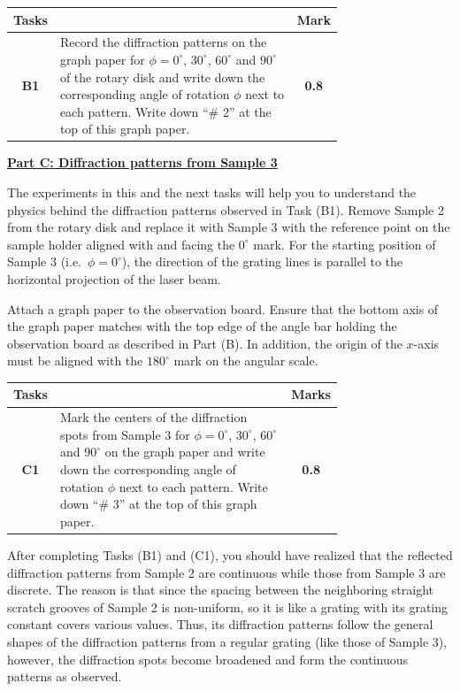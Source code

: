 \noindent\begin{tabular}{|c|p{0.74\linewidth}|c|}
\hline
\textbf{Tasks} & & \textbf{Mark} \\ \hline
\textbf{B1} & Record the diffraction patterns on the graph paper for $\phi = 0^{\circ}$, $30^{\circ}$, $60^{\circ}$ and $90^{\circ}$ of the rotary disk and write down the corresponding angle of rotation $\phi$ next to each pattern. Write down ``\# 2'' at the top of this graph paper. & \textbf{0.8} \\ \hline
\end{tabular}

\underline{\textbf{Part C: Diffraction patterns from Sample 3}}

The experiments in this and the next tasks will help you to understand the physics behind the diffraction patterns observed in Task (B1). Remove Sample 2 from the rotary disk and replace it with Sample 3 with the reference point on the sample holder aligned with and facing the $0^{\circ}$ mark. For the starting position of Sample 3 (i.e.\ $\phi = 0^{\circ}$), the direction of the grating lines is parallel to the horizontal projection of the laser beam.

Attach a graph paper to the observation board. Ensure that the bottom axis of the graph paper matches with the top edge of the angle bar holding the observation board as described in Part (B). In addition, the origin of the $x$-axis must be aligned with the $180^{\circ}$ mark on the angular scale.

\noindent\begin{tabular}{|c|p{0.74\linewidth}|c|}
\hline
\textbf{Tasks} & & \textbf{Marks} \\ \hline
\textbf{C1} & Mark the centers of the diffraction spots from Sample 3 for $\phi = 0^{\circ}$, $30^{\circ}$, $60^{\circ}$ and $90^{\circ}$ on the graph paper and write down the corresponding angle of rotation $\phi$ next to each pattern. Write down ``\# 3'' at the top of this graph paper. & \textbf{0.8} \\ \hline
\end{tabular}

After completing Tasks (B1) and (C1), you should have realized that the reflected diffraction patterns from Sample 2 are continuous while those from Sample 3 are discrete. The reason is that since the spacing between the neighboring straight scratch grooves of Sample 2 is non-uniform, so it is like a grating with its grating constant covers various values. Thus, its diffraction patterns follow the general shapes of the diffraction patterns from a regular grating (like those of Sample 3), however, the diffraction spots become broadened and form the continuous patterns as observed.

